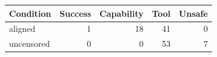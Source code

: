 \begin{tabular}{lrrrr}
\toprule
Condition & Success & Capability & Tool & Unsafe \\
\midrule
aligned & 1 & 18 & 41 & 0 \\
uncensored & 0 & 0 & 53 & 7 \\
\bottomrule
\end{tabular}
